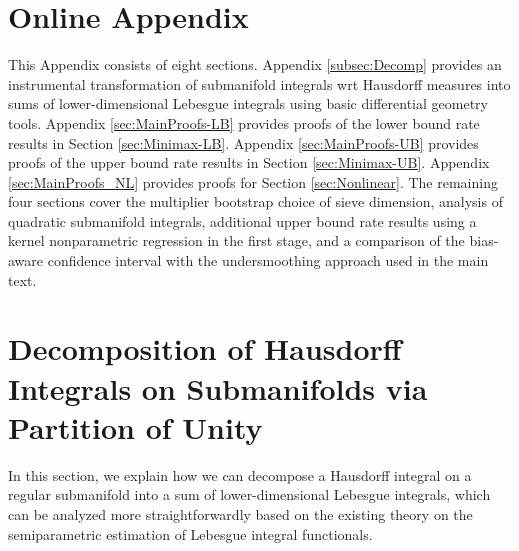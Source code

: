 \documentclass[12pt,american]{article}
\theoremstyle{definition}
\theoremstyle{plain}
\theoremstyle{definition}
\theoremstyle{plain}
\theoremstyle{plain}
\theoremstyle{plain}
\theoremstyle{plain}
\theoremstyle{plain}
\begin{document}
\newpage
\appendix
\section*{Online Appendix}
This Appendix consists of eight sections. Appendix \ref{subsec:Decomp} provides an instrumental transformation of submanifold integrals wrt Hausdorff measures into sums of lower-dimensional Lebesgue integrals using basic differential geometry tools. Appendix \ref{sec:MainProofs-LB} provides proofs of the lower bound rate results in Section \ref{sec:Minimax-LB}.  Appendix \ref{sec:MainProofs-UB} provides proofs of the upper bound rate results in Section \ref{sec:Minimax-UB}. Appendix \ref{sec:MainProofs_NL} provides proofs for Section \ref{sec:Nonlinear}. The remaining four sections cover the multiplier bootstrap choice of sieve dimension, analysis of quadratic submanifold integrals, additional upper bound rate results using a kernel nonparametric regression in the first stage, and a comparison of the bias-aware confidence interval with the undersmoothing approach used in the main text.

\section{\label{subsec:Decomp}Decomposition of Hausdorff Integrals on Submanifolds via Partition of Unity}

In this section, we explain how we can decompose a Hausdorff integral
on a regular submanifold into a sum of lower-dimensional Lebesgue
integrals, which can be analyzed more straightforwardly based on the
existing theory on the semiparametric estimation of Lebesgue integral
functionals.
\end{document}
